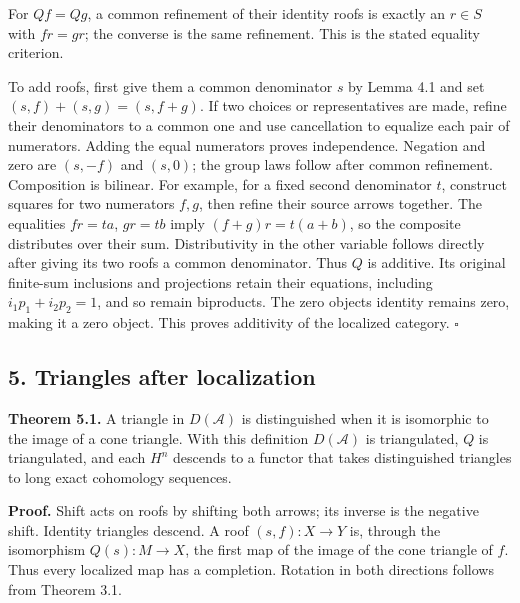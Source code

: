 \documentclass[
  english,
  11pt,
  a4paper,
]{article}
\begin{document}
For \(Qf=Qg\), a common refinement of their identity roofs is exactly an
\(r\in S\) with \(fr=gr\); the converse is the same refinement. This is
the stated equality criterion.

To add roofs, first give them a common denominator \(s\) by Lemma 4.1
and set \((s,f)+(s,g)=(s,f+g)\). If two choices or representatives are
made, refine their denominators to a common one and use cancellation to
equalize each pair of numerators. Adding the equal numerators proves
independence. Negation and zero are \((s,-f)\) and \((s,0)\); the group
laws follow after common refinement. Composition is bilinear. For
example, for a fixed second denominator \(t\), construct squares for two
numerators \(f,g\), then refine their source arrows together. The
equalities \(fr=ta\), \(gr=tb\) imply \((f+g)r=t(a+b)\), so the
composite distributes over their sum. Distributivity in the other
variable follows directly after giving its two roofs a common
denominator. Thus \(Q\) is additive. Its original finite-sum inclusions
and projections retain their equations, including \(i_1p_1+i_2p_2=1\),
and so remain biproducts. The zero object\textquotesingle s identity
remains zero, making it a zero object. This proves additivity of the
localized category. \(\square\)

\subsection{5. Triangles after
localization}\label{complexes-cones-and-localization--5-triangles-after-localization}

\textbf{Theorem 5.1.} A triangle in \(D(\mathcal A)\) is distinguished
when it is isomorphic to the image of a cone triangle. With this
definition \(D(\mathcal A)\) is triangulated, \(Q\) is triangulated, and
each \(H^n\) descends to a functor that takes distinguished triangles to
long exact cohomology sequences.

\textbf{Proof.} Shift acts on roofs by shifting both arrows; its inverse
is the negative shift. Identity triangles descend. A roof
\((s,f):X\to Y\) is, through the isomorphism \(Q(s):M\to X\), the first
map of the image of the cone triangle of \(f\). Thus every localized map
has a completion. Rotation in both directions follows from Theorem 3.1.
\end{document}
